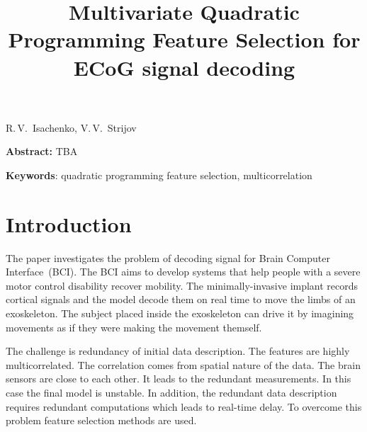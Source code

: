 \documentclass[12pt,twoside]{article}
\theoremstyle{definition}
\begin{document}
	
	\linenumbers
	
	\title
{Multivariate Quadratic Programming Feature Selection for ECoG signal decoding}
\date{}
\maketitle
\begin{center}
	R.\,V.~Isachenko,
	V.\,V.~Strijov
\end{center}
\textbf{Abstract:} 
TBA

\bigskip
\textbf{Keywords}: quadratic programming feature selection, multicorrelation

\section{Introduction}
The paper investigates the problem of decoding signal for Brain Computer Interface~(BCI). 
The BCI aims to develop systems that help people with a severe motor control disability recover mobility.
The minimally-invasive implant records cortical signals and the model decode them on real time to move the limbs of an exoskeleton.
The subject placed inside the exoskeleton can drive it by imagining movements as if they were making the movement themself. 

The challenge is redundancy of initial data description. The features are highly multicorrelated. The correlation comes from spatial nature of the data. The brain sensors are close to each other. It leads to the redundant measurements. In this case the final model is unstable. In addition, the redundant data description requires redundant computations which leads to real-time delay. To overcome this problem feature selection methods are used.
\end{document}
